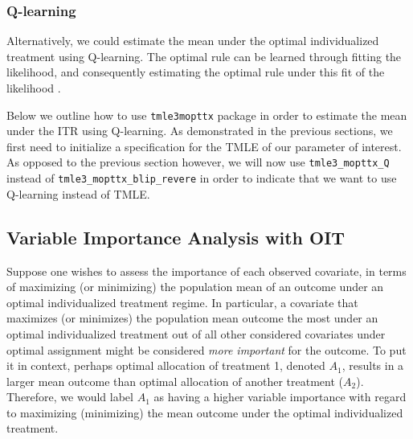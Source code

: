 \documentclass[12pt, krantz2,]{krantz}
\newenvironment{Shaded}{\begin{snugshade}}{\end{snugshade}}
\newcommand{\CommentTok}[1]{\textcolor[rgb]{0.37,0.37,0.37}{\textit{#1}}}
\newcommand{\DataTypeTok}[1]{\textcolor[rgb]{0.27,0.27,0.27}{#1}}
\newcommand{\DecValTok}[1]{\textcolor[rgb]{0.06,0.06,0.06}{#1}}
\newcommand{\KeywordTok}[1]{\textcolor[rgb]{0.27,0.27,0.27}{\textbf{#1}}}
\newcommand{\NormalTok}[1]{#1}
\newcommand{\OperatorTok}[1]{\textcolor[rgb]{0.43,0.43,0.43}{\textbf{#1}}}
\newcommand{\OtherTok}[1]{\textcolor[rgb]{0.37,0.37,0.37}{#1}}
\newcommand{\StringTok}[1]{\textcolor[rgb]{0.5,0.5,0.5}{#1}}
\theoremstyle{definition}
\theoremstyle{definition}
\theoremstyle{definition}
\newcommand{\1}{\mathbbm{1}}
\begin{document}
\hypertarget{q-learning}{%
\subsubsection{Q-learning}\label{q-learning}}

Alternatively, we could estimate the mean under the optimal individualized
treatment using Q-learning. The optimal rule can be learned through fitting the
likelihood, and consequently estimating the optimal rule under this fit of the
likelihood \citep{Sutton1998, murphy2003}.

Below we outline how to use \texttt{tmle3mopttx} package in order to estimate the mean
under the ITR using Q-learning. As demonstrated in the previous sections, we
first need to initialize a specification for the TMLE of our parameter of
interest. As opposed to the previous section however, we will now use
\texttt{tmle3\_mopttx\_Q} instead of \texttt{tmle3\_mopttx\_blip\_revere} in order to indicate that
we want to use Q-learning instead of TMLE.

\begin{Shaded}
\end{Shaded}

\hypertarget{variable-importance-analysis-with-oit}{%
\subsection{Variable Importance Analysis with OIT}\label{variable-importance-analysis-with-oit}}

Suppose one wishes to assess the importance of each observed covariate, in
terms of maximizing (or minimizing) the population mean of an outcome under an
optimal individualized treatment regime. In particular, a covariate that
maximizes (or minimizes) the population mean outcome the most under an optimal
individualized treatment out of all other considered covariates under optimal
assignment might be considered \emph{more important} for the outcome. To put it in
context, perhaps optimal allocation of treatment 1, denoted \(A_1\), results in a
larger mean outcome than optimal allocation of another treatment (\(A_2\)).
Therefore, we would label \(A_1\) as having a higher variable importance with
regard to maximizing (minimizing) the mean outcome under the optimal
individualized treatment.
\end{document}

